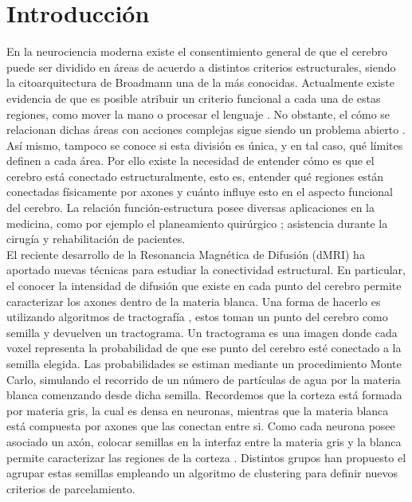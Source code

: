 \chapter{Introducci\'on}

En la neurociencia moderna existe el consentimiento general de que el cerebro
puede ser dividido en \'areas de acuerdo a distintos criterios estructurales,
siendo la citoarquitectura de Broadmann \cite{Brodmann1909} una de la m\'as conocidas.
Actualmente existe evidencia de que es posible atribuir un criterio funcional
a cada una de estas regiones, como mover la mano o procesar el lenguaje
\cite{Greicius2003}. No obstante, el c\'omo se relacionan dichas \'areas con acciones
complejas sigue siendo un problema abierto \cite{Barch2013}. As\'i mismo, tampoco
se conoce si esta divisi\'on es \'unica, y en tal caso, qu\'e l\'imites definen
a cada \'area. Por ello existe la necesidad de entender c\'omo es que el cerebro
est\'a conectado estructuralmente, esto es, entender qu\'e regiones est\'an 
conectadas f\'isicamente por axones y cu\'anto influye esto en el aspecto funcional
del cerebro. La relaci\'on funci\'on-estructura posee diversas aplicaciones en la
medicina, como por ejemplo el planeamiento quir\'urgico \cite{Stufflebeam2011}
\cite{Oishi2010}; asistencia durante la cirug\'ia \cite{Bello2008} y 
rehabilitaci\'on \cite{Song2014} de pacientes. \\

El reciente desarrollo de la Resonancia Magn\'etica de Difusi\'on (dMRI) ha
aportado nuevas t\'ecnicas para estudiar la conectividad estructural.
En particular, el conocer la intensidad de difusi\'on que existe en cada punto del 
cerebro permite caracterizar los axones dentro de la materia blanca. Una forma 
de hacerlo es utilizando algoritmos de tractograf\'ia \cite{Descoteaux2009}
\cite{Jbabdi2007}, estos toman un punto del cerebro como semilla y devuelven un
tractograma. Un tractograma es una imagen donde cada voxel representa la
probabilidad de que ese punto del cerebro est\'e conectado a la semilla elegida.
Las probabilidades se estiman mediante un procedimiento Monte Carlo, simulando el
recorrido de un n\'umero de part\'iculas de agua por la materia blanca comenzando
desde dicha semilla. Recordemos que la corteza est\'a formada
por materia gris, la cual es densa en neuronas, mientras que la materia blanca
est\'a compuesta por axones que las conectan entre si. Como cada neurona posee
asociado un ax\'on, colocar semillas en la interfaz entre la materia gris y la
blanca permite caracterizar las regiones de la corteza \cite{Mori2002}
\cite{Anwander2006}. Distintos grupos han propuesto el agrupar estas semillas
empleando un algoritmo de clustering para definir nuevos criterios de parcelamiento. \\

